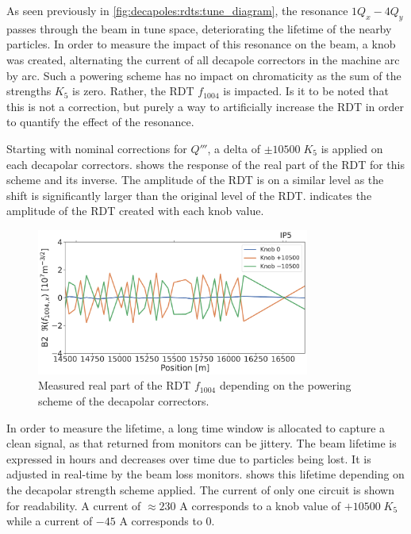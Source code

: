 As seen previously in \cref{fig:decapoles:rdts:tune_diagram}, the resonance $1Q_x - 4Q_y$ passes
through the beam in tune space, deteriorating the lifetime of the nearby particles.
In order to measure the impact of this resonance on the beam, a knob was created, alternating the 
current of all decapole correctors in the machine arc by arc. Such a powering scheme has no impact
on chromaticity as the sum of the strengths $K_5$ is zero. Rather, the RDT $f_{1004}$ is impacted.
Is it to be noted that this is not a correction, but purely a way to artificially increase the RDT
in order to quantify the effect of the resonance.

Starting with nominal corrections for $Q'''$, a delta of $\pm 10500\;K_5$ is applied on
each decapolar correctors.  shows the response of the
real part of the RDT for this scheme and its inverse. The amplitude of the RDT is on a similar level
as the shift is significantly larger than the original level of the RDT.
 indicates the amplitude of the RDT created with each
knob value.

\begin{figure}[!htb]
    \centering
    \includegraphics[width=0.8\textwidth]{./images/f1004/f1004x_knob_alt_lifetime_real.pdf}
    \caption{Measured real part of the RDT $f_{1004}$ depending on the powering scheme of the decapolar
    correctors.}
    \label{fig:decapoles:impact:alternating_knob}
\end{figure}

In order to measure the lifetime, a long time window is allocated to capture a clean signal, as that
returned from monitors can be jittery. The beam lifetime is expressed in hours and decreases over
time due to particles being lost. It is adjusted in real-time by the beam loss monitors.
 shows this lifetime depending on the decapolar strength
scheme applied. The current of only one circuit is shown for readability. A current of $\approx 230$
A corresponds to a knob value of $+10500\;K_5$ while a current of $-45$ A corresponds to $0$.

